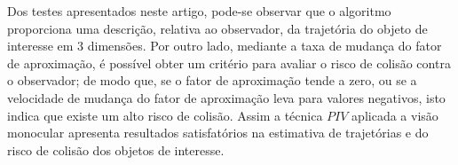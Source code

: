 
\begin{comment}
From the presented examples,
it can be observed that one application that uses the tracking
and the departure factor is related with the risk of collision.
It is possible to estimate how of fast an object is departing.
Thus, if the  departure factor tends to zero or 
if the velocity of departure factor changes to lower negatives values every time, 
probably, there is a high risk of collision. The $PIV$ technique has presented satisfactory results. 
It can be concluded that estimating collision using velocity of departure factor, 
tracking of objects in 2 or 3 dimensions, and departure distance
relative to the first position of $ROI$. 
The simulations in both cases has given promissory results.
\end{comment}

Dos testes apresentados neste artigo, pode-se observar que o algoritmo
 proporciona uma descrição, relativa ao observador, 
da trajetória do objeto de interesse em 3 dimensões.
Por outro lado, mediante a taxa de mudança do fator de aproximação, é possível  obter 
um critério para avaliar o risco de colisão contra o observador;
de modo que, se o fator de aproximação tende a zero, ou se a velocidade de mudança
do fator de aproximação leva 
para valores negativos, isto indica que
existe um alto risco de colisão.
Assim a técnica $PIV$ aplicada a visão monocular apresenta resultados satisfatórios 
na estimativa de trajetórias e do risco de colisão dos objetos de interesse.

